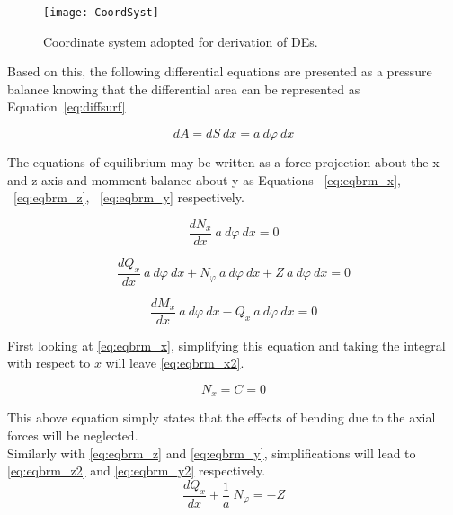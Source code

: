 \begin{figure}[H]
	\centering
	\texttt{[image: CoordSyst]}
	\caption[Coordinate system adopted for derivation of DEs.]{Coordinate system adopted for derivation of DEs.\protect\cite{timoshenko1959theory}}
	\label{fig:CoordSyst}
\end{figure}

Based on this, the following differential equations are presented as a pressure balance knowing that the differential area can be represented as Equation~\ref{eq:diffsurf}
 
\begin{equation}
	\label{eq:diffsurf}
	dA = dS\ dx = a\ d\varphi \ dx   
\end{equation}

The equations of equilibrium may be written as a force projection about the x and z axis and momment balance about y as Equations ~\ref{eq:eqbrm_x}, ~\ref{eq:eqbrm_z}, ~\ref{eq:eqbrm_y} respectively.

\begin{equation}
	\label{eq:eqbrm_x}
	\frac{dN_x}{dx}\ a\ d\varphi \ dx = 0
\end{equation}

\begin{equation}
	\label{eq:eqbrm_z}
	\frac{dQ_x}{dx}\ a\ d\varphi \ dx+ N_\varphi \ a\ d\varphi \ dx +Z\ a\ d\varphi \ dx= 0
\end{equation}

\begin{equation}
	\label{eq:eqbrm_y}
	\frac{dM_x}{dx}\ a\ d\varphi \ dx- Q_x\ a\ d\varphi \ dx= 0
\end{equation}

First looking at \ref{eq:eqbrm_x}, simplifying this equation and taking the integral with respect to $x$ will leave \ref{eq:eqbrm_x2}. 

\begin{equation}
	\label{eq:eqbrm_x2}
	N_x = C = 0 
\end{equation}

This above equation simply states that the effects of bending due to the axial forces will be neglected.\\

Similarly with \ref{eq:eqbrm_z} and \ref{eq:eqbrm_y}, simplifications will lead to \ref{eq:eqbrm_z2} and \ref{eq:eqbrm_y2} respectively.
\begin{equation}
	\label{eq:eqbrm_z2}
	\frac{dQ_x}{dx}+\frac{1}{a}\ N_\varphi = -Z
\end{equation}

